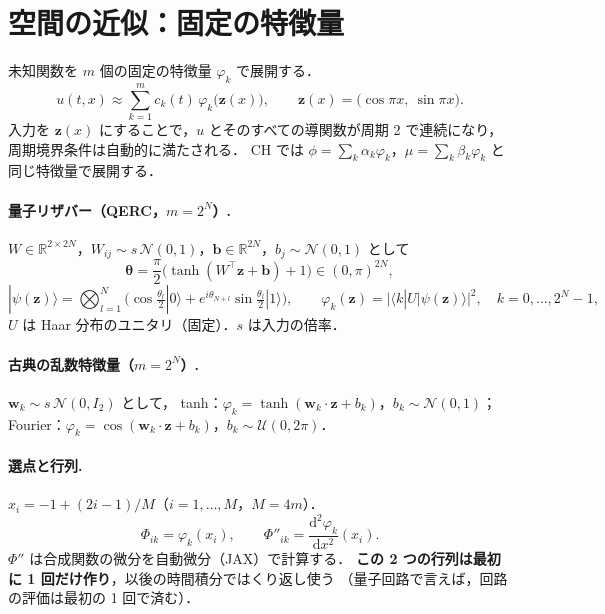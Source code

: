 \documentclass[uplatex,dvipdfmx,a4paper,11pt]{jsarticle}
\newcommand{\dd}{\mathrm{d}}
\newcommand{\R}{\mathbb{R}}
\begin{document}
\section{空間の近似：固定の特徴量}
未知関数を $m$ 個の固定の特徴量 $\varphi_k$ で展開する．
\begin{equation}
  u(t,x)\approx\sum_{k=1}^{m}c_k(t)\,\varphi_k\big(\bm z(x)\big),\qquad
  \bm z(x)=\big(\cos\pi x,\ \sin\pi x\big).
\end{equation}
入力を $\bm z(x)$ にすることで，$u$ とそのすべての導関数が周期 2 で連続になり，周期境界条件は自動的に満たされる．
CH では $\phi=\sum_k\alpha_k\varphi_k$，$\mu=\sum_k\beta_k\varphi_k$ と同じ特徴量で展開する．

\paragraph{量子リザバー（QERC，$m=2^N$）.}
$W\in\R^{2\times2N}$，$W_{ij}\sim s\,\mathcal N(0,1)$，$\bm b\in\R^{2N}$，$b_j\sim\mathcal N(0,1)$ として
\begin{equation}
  \bm\theta=\frac{\pi}{2}\big(\tanh(W^{\top}\bm z+\bm b)+1\big)\in(0,\pi)^{2N},
\end{equation}
\begin{equation}
  |\psi(\bm z)\rangle=\bigotimes_{l=1}^{N}\Big(\cos\tfrac{\theta_l}{2}|0\rangle+e^{i\theta_{N+l}}\sin\tfrac{\theta_l}{2}|1\rangle\Big),\qquad
  \varphi_k(\bm z)=\big|\langle k|U|\psi(\bm z)\rangle\big|^2,\quad k=0,\dots,2^N-1,
\end{equation}
$U$ は Haar 分布のユニタリ（固定）．$s$ は入力の倍率．

\paragraph{古典の乱数特徴量（$m=2^N$）.}
$\bm w_k\sim s\,\mathcal N(0,I_2)$ として，
tanh：$\varphi_k=\tanh(\bm w_k\cdot\bm z+b_k)$，$b_k\sim\mathcal N(0,1)$；
Fourier：$\varphi_k=\cos(\bm w_k\cdot\bm z+b_k)$，$b_k\sim\mathcal U(0,2\pi)$．

\paragraph{選点と行列.}
$x_i=-1+(2i-1)/M$（$i=1,\dots,M$，$M=4m$）．
\begin{equation}
  \Phi_{ik}=\varphi_k(x_i),\qquad \Phi''_{ik}=\frac{\dd^2\varphi_k}{\dd x^2}(x_i).
\end{equation}
$\Phi''$ は合成関数の微分を自動微分（JAX）で計算する．
\textbf{この 2 つの行列は最初に 1 回だけ作り}，以後の時間積分ではくり返し使う
（量子回路で言えば，回路の評価は最初の 1 回で済む）．
\end{document}
